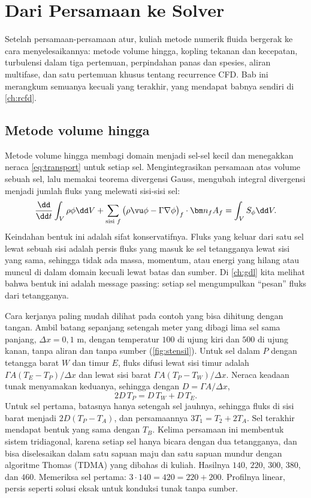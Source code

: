 \chapter{Dari Persamaan ke Solver}
\label{ch:numerik}

Setelah persamaan-persamaan atur, kuliah metode numerik fluida bergerak ke cara menyelesaikannya:
metode volume hingga, kopling tekanan dan kecepatan, turbulensi dalam tiga pertemuan, perpindahan
panas dan spesies, aliran multifase, dan satu pertemuan khusus tentang recurrence CFD. Bab ini
merangkum semuanya kecuali yang terakhir, yang mendapat babnya sendiri di \cref{ch:rcfd}.

\section{Metode volume hingga}

Metode volume hingga membagi domain menjadi sel-sel kecil dan menegakkan neraca \cref{eq:transport}
untuk setiap sel. Mengintegrasikan persamaan atas volume sebuah sel, lalu memakai teorema divergensi
Gauss, mengubah integral divergensi menjadi jumlah fluks yang melewati sisi-sisi sel:
\begin{equation}
\frac{\dd}{\dd t}\int_V\rho\phi\dd V+\sum_{\text{sisi }f}\big(\rho\vu\phi-\Gamma\nabla\phi\big)_f\cdot\bm n_fA_f=\int_VS_\phi\dd V.
\end{equation}
Keindahan bentuk ini adalah sifat konservatifnya. Fluks yang keluar dari satu sel lewat sebuah sisi
adalah persis fluks yang masuk ke sel tetangganya lewat sisi yang sama, sehingga tidak ada massa,
momentum, atau energi yang hilang atau muncul di dalam domain kecuali lewat batas dan sumber. Di
\cref{ch:gdl} kita melihat bahwa bentuk ini adalah message passing: setiap sel mengumpulkan ``pesan''
fluks dari tetangganya.

Cara kerjanya paling mudah dilihat pada contoh yang bisa dihitung dengan tangan. Ambil batang sepanjang
setengah meter yang dibagi lima sel sama panjang, $\Delta x=0{,}1$ m, dengan temperatur $100$ di ujung kiri dan
$500$ di ujung kanan, tanpa aliran dan tanpa sumber (\cref{fig:stensil}). Untuk sel dalam $P$ dengan tetangga
barat $W$ dan timur $E$, fluks difusi lewat sisi timur adalah $\Gamma A(T_E-T_P)/\Delta x$ dan lewat sisi barat
$\Gamma A(T_P-T_W)/\Delta x$. Neraca keadaan tunak menyamakan keduanya, sehingga dengan $D=\Gamma A/\Delta x$,
\begin{equation}
2D\,T_P=D\,T_W+D\,T_E .
\end{equation}
Untuk sel pertama, batasnya hanya setengah sel jauhnya, sehingga fluks di sisi barat menjadi
$2D(T_P-T_A)$, dan persamaannya $3T_1=T_2+2T_A$. Sel terakhir mendapat bentuk yang sama dengan $T_B$. Kelima
persamaan ini membentuk sistem tridiagonal, karena setiap sel hanya bicara dengan dua tetangganya, dan bisa
diselesaikan dalam satu sapuan maju dan satu sapuan mundur dengan algoritme Thomas (TDMA) yang dibahas di kuliah.
Hasilnya $140$, $220$, $300$, $380$, dan $460$. Memeriksa sel pertama: $3\cdot140=420=220+200$. Profilnya linear,
persis seperti solusi eksak untuk konduksi tunak tanpa sumber.


